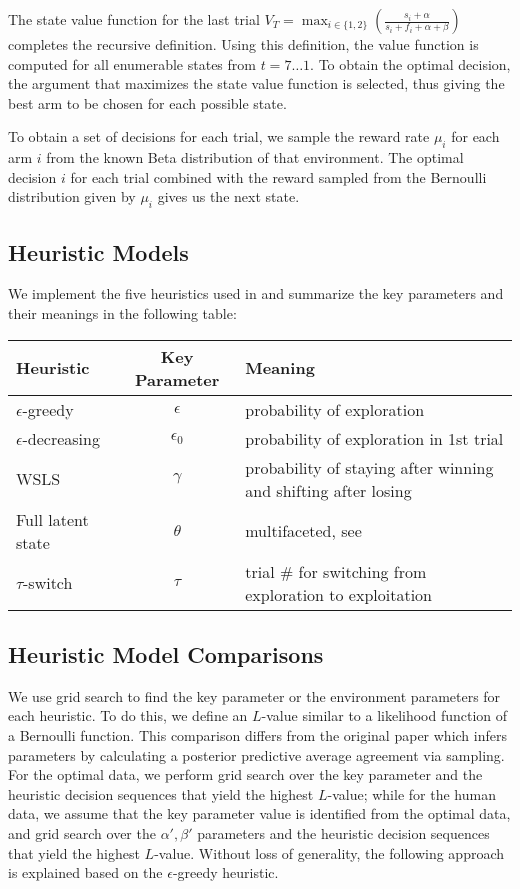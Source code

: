 The state value function for the last trial $V_T=\max_{i \in \{1,2\}} (\frac{s_i + \alpha}{s_i + f_i + \alpha + \beta})$ completes the recursive definition. Using this definition, the value function is computed for all enumerable states from $t=7\ldots1$. To obtain the optimal decision, the argument that maximizes the state value function is selected, thus giving the best arm to be chosen for each possible state. 

To obtain a set of decisions for each trial, we sample the reward rate $\mu_i$ for each arm $i$ from the known Beta distribution of that environment. The optimal decision $i$ for each trial combined with the reward sampled from the Bernoulli distribution given by $\mu_i$ gives us the next state.

\subsection{Heuristic Models}
We implement the five heuristics used in \cite{shunan2011} and summarize the key parameters and their meanings in the following table: 

\begin{table}[h]
\begin{tabular}{|l|c|l|}
\hline
\textbf{Heuristic} & \textbf{Key Parameter} & \textbf{Meaning} \\ \hline
$\epsilon$-greedy & $\epsilon$ & probability of exploration \\ \hline
$\epsilon$-decreasing & $\epsilon_0$ & probability of exploration in 1st trial \\ \hline
WSLS & $\gamma$ & probability of staying after winning and shifting after losing \\ \hline
Full latent state & $\theta$ & multifaceted, see \cite{shunan2009} \\ \hline
$\tau$-switch & $\tau$ & trial \# for switching from exploration to exploitation \\ \hline
\end{tabular}
\end{table}

\subsection{Heuristic Model Comparisons}
We use grid search to find the key parameter or the environment parameters for each heuristic. To do this, we define an $L$-value similar to a likelihood function of a Bernoulli function. This comparison differs from the original paper which infers parameters by calculating a posterior predictive average agreement via sampling. For the optimal data, we perform grid search over the key parameter and the heuristic decision sequences that yield the highest $L$-value; while for the human data, we assume that the key parameter value is identified from the optimal data, and grid search over the $\alpha',\beta'$ parameters and the heuristic decision sequences that yield the highest $L$-value. Without loss of generality, the following approach is explained based on the $\epsilon$-greedy heuristic. 

